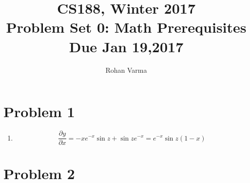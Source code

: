 \documentclass[11pt]{article}
\newcommand{\cnum}{CS188}
\newcommand{\ced}{Winter 2017}
\newcommand{\ctitle}[3]{\title{\vspace{-0.5in}\cnum, \ced\\Problem Set #1: #2\\Due #3}}
\newcommand{\solution}[1]{{{\color{blue}{\bf Solution:} {#1}}}}
\begin{document}
\ctitle{0}{Math Prerequisites}{Jan 19,2017}
\author{Rohan Varma}
\date{}
\maketitle
\vspace{-0.75in}

\section{Problem 1}
\begin{enumerate}
\item 

\solution{
\[
\displaystyle \frac{\partial y}{\partial x} = -x e^{-x}\sin{z} + \sin{z}e^{-x} = e^{-x}\sin{z}(1 - x)
\]
}

\vspace{10cm}
\end{enumerate}

\newpage
\section{Problem 2}
\end{document}
